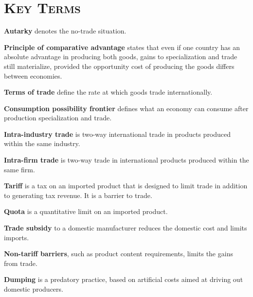 \newpage
{}
	\section*{\textsc{Key Terms}}
\begin{keyterms}
\textbf{Autarky} denotes the no-trade situation.

\textbf{Principle of comparative advantage} states that even if one country has an absolute advantage in producing both goods, gains to specialization and trade still materialize, provided the opportunity cost of producing the goods differs between economies.

\textbf{Terms of trade} define the rate at which goods trade internationally.

\textbf{Consumption possibility frontier} defines what an economy can consume after production specialization and trade.

\textbf{Intra-industry trade} is two-way international trade in products produced within the same industry.

\textbf{Intra-firm trade} is two-way trade in international products produced within the same firm.

\textbf{Tariff} is a tax on an imported product that is designed to limit trade in addition to generating tax revenue. It is a barrier to trade.

\textbf{Quota} is a quantitative limit on an imported product.

\textbf{Trade subsidy} to a domestic manufacturer reduces the domestic cost and limits imports.

\textbf{Non-tariff barriers}, such as product content requirements, limits the gains from trade.

\textbf{Dumping} is a predatory practice, based on artificial costs aimed at driving out domestic producers.
\end{keyterms}